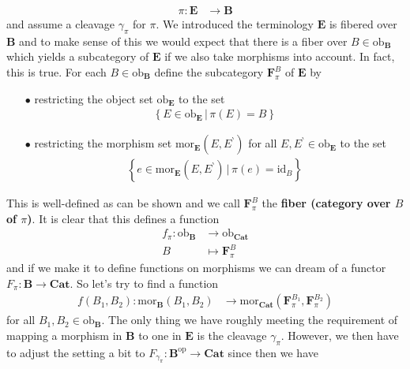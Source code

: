\begin{align*}
  \pi
  \colon
  \mathbf{E}
  &\rightarrow
  \mathbf{B}
\end{align*}
and assume a cleavage $\gamma_{\pi}$ for $\pi$. We introduced the terminology {\glqq}$\mathbf{E}$ is fibered over $\mathbf{B}${\grqq} and to make sense of this we would expect that there is a fiber over $B \in \mathrm{ob}_{\mathbf{B}}$ which yields a subcategory of $\mathbf{E}$ if we also take morphisms into account. In fact, this is true. For each $B \in \mathrm{ob}_{\mathbf{B}}$ define the subcategory $\mathbf{F}_{\pi}^{B}$ of $\mathbf{E}$ by
\begin{enumerate}
\item[$\bullet$]
restricting the object set $\mathrm{ob}_{\mathbf{E}}$ to the set
\begin{align*}
  \left\lbrace
      E
      \in
      \mathrm{ob}_{\mathbf{E}}
    \,
    \vert
    \,
      \pi(E)
      =
      B
  \right\rbrace
\end{align*}
\item[$\bullet$]
restricting the morphism set $\mathrm{mor}_{\mathbf{E}}(E,E^{\backprime})$ for all $E,E^{\backprime} \in \mathrm{ob}_{\mathbf{E}}$ to the set
\begin{align*}
  \left\lbrace
      e
      \in
      \mathrm{mor}_{\mathbf{E}}(E,E^{\backprime})
    \,
    \vert
    \,
      \pi(e)
      =
      \mathrm{id}_{B}
  \right\rbrace
\end{align*}
\end{enumerate}
This is well-defined as can be shown and we call $\mathbf{F}_{\pi}^{B}$ the \textbf{fiber (category over $B$ of $\pi$)}. It is clear that this defines a function
\begin{align*}
  f_{\pi}
  \colon
  \mathrm{ob}_{\mathbf{B}}
  &\rightarrow
  \mathrm{ob}_{\mathbf{Cat}}
  \\
  B
  &\mapsto
  \mathbf{F}_{\pi}^{B}
\end{align*}
and if we make it to define functions on morphisms we can dream of a functor $F_{\pi} \colon \mathbf{B} \rightarrow \mathbf{Cat}$. So let's try to find a function
\begin{align*}
  f(B_{1},B_{2})
  \colon
  \mathrm{mor}_{\mathbf{B}}(B_{1},B_{2})
  &\rightarrow
  \mathrm{mor}_{\mathbf{Cat}}
  \left(
    \mathbf{F}_{\pi}^{B_{1}},
    \mathbf{F}_{\pi}^{B_{2}}
  \right)
\end{align*}
for all $B_{1},B_{2} \in \mathrm{ob}_{\mathbf{B}}$. The only thing we have roughly meeting the requirement of mapping a morphism in $\mathbf{B}$ to one in $\mathbf{E}$ is the cleavage $\gamma_{\pi}$. However, we then have to adjust the setting a bit to $F_{\gamma_{\pi}} \colon \mathbf{B}^{\mathrm{op}} \rightarrow \mathbf{Cat}$ since then we have
